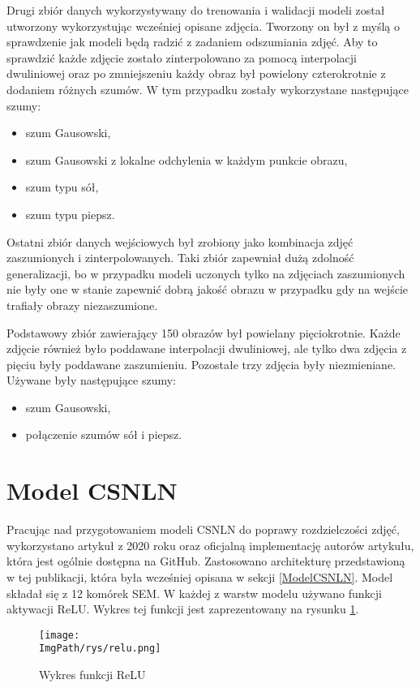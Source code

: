 \documentclass[a4paper,12pt,twoside,openany]{report}
\newcommand{\ImgPath}{.}
\begin{document}
	Drugi zbiór danych wykorzystywany do trenowania i walidacji modeli został utworzony wykorzystując wcześniej opisane zdjęcia. Tworzony on był z myślą o sprawdzenie jak modeli będą radzić z zadaniem odszumiania zdjęć. Aby to sprawdzić każde zdjęcie zostało zinterpolowano za pomocą interpolacji dwuliniowej oraz po zmniejszeniu każdy obraz był powielony czterokrotnie z dodaniem różnych szumów. W tym przypadku zostały wykorzystane następujące szumy:
	\begin{itemize}
		\item szum Gausowski,
		\item szum Gausowski z lokalne odchylenia w każdym punkcie obrazu,
		\item szum typu sół,
		\item szum typu piepsz.
	\end{itemize} 

	Ostatni zbiór danych wejściowych był zrobiony jako kombinacja zdjęć zaszumionych i zinterpolowanych. Taki zbiór zapewniał dużą zdolność generalizacji, bo w przypadku modeli uczonych tylko na zdjęciach zaszumionych nie były one w stanie zapewnić dobrą jakość obrazu w przypadku gdy na wejście trafiały obrazy niezaszumione. 

	Podstawowy zbiór zawierający 150 obrazów był powielany pięciokrotnie. Każde zdjęcie również było poddawane interpolacji dwuliniowej, ale tylko dwa zdjęcia z pięciu były poddawane zaszumieniu. Pozostałe trzy zdjęcia były niezmieniane. Używane były następujące szumy:
	\begin{itemize}
	 	\item szum Gausowski,
	 	\item połączenie szumów sół i piepsz.
	\end{itemize} 

\section{Model CSNLN}
\label{Model CSNLN}
	Pracując nad przygotowaniem modeli CSNLN do poprawy rozdzielczości zdjęć, wykorzystano artykuł \cite{CSNLN} z 2020 roku oraz oficjalną implementację autorów artykułu, która jest ogólnie dostępna na GitHub. Zastosowano architekturę przedstawioną w tej publikacji, która była  wcześniej opisana  w  sekcji  \ref{ModelCSNLN}. Model składał się z 12 komórek SEM. W każdej z warstw modelu używano funkcji aktywacji ReLU. Wykres tej funkcji jest zaprezentowany na rysunku \ref{relu}.
	\begin{figure}[!htbp]
		\begin{center}
			\centering
			\texttt{[image: \\ImgPath/rys/relu.png]}
		\end{center}
		\caption{Wykres funkcji ReLU}
		\label{relu}
	\end{figure}    
\end{document}
